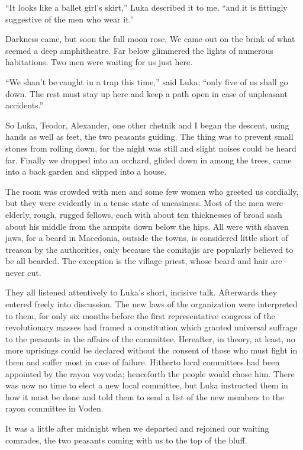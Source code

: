 \documentclass[a5paper,12pt]{book}
\begin{document}
“It looks like a ballet girl’s skirt,” Luka described it to me, “and it is fittingly suggestive of the men who wear it.” 

Darkness came, but soon the full moon rose. We came out on the brink of what seemed a deep amphitheatre. Far below glimmered the lights of numerous habitations. Two men were waiting for us just here. 

“We shan’t be caught in a trap this time,” said Luka; “only five of us shall go down. The rest must stay up here and keep a path open in case of unpleasant accidents.” 

So Luka, Teodor, Alexander, one other chetnik and I began the descent, using hands as well as feet, the two peasants guiding. The thing was to prevent small stones from rolling down, for the night was still and slight noises could be heard far. Finally we dropped into an orchard, glided down in among the trees, came into a back garden and slipped into a house. 

The room was crowded with men and some few women who greeted us cordially, but they were evidently in a tense state of uneasiness. Most of the men were elderly, rough, rugged fellows, each with about ten thicknesses of broad sash about his middle from the armpits down below the hips. All were with shaven jaws, for a beard in Macedonia, outside the towns, is considered little short of treason by the authorities, only because the comitajis are popularly believed to be all bearded. The exception is the village priest, whose beard and hair are never cut. 

They all listened attentively to Luka’s short, incisive talk. Afterwards they entered freely into discussion. The new laws of the organization were interpreted to them, for only six months before the first representative congress of the revolutionary masses had framed a constitution which granted universal suffrage to the peasants in the affairs of the committee. Hereafter, in theory, at least, no more uprisings could be declared without the consent of those who must fight in them and suffer most in case of failure. Hitherto local committees had been appointed by the rayon voyvoda; henceforth the people would chose him. There was now no time to elect a new local committee, but Luka instructed them in how it must be done and told them to send a list of the new members to the rayon committee in Voden. 

It was a little after midnight when we departed and rejoined our waiting comrades, the two peasants coming with us to the top of the bluff. 
\end{document}
